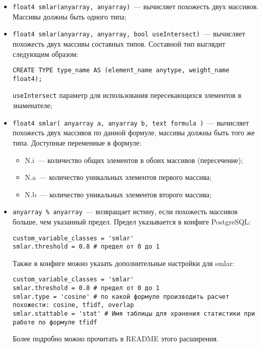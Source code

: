 \begin{itemize}
  \item \lstinline!float4 smlar(anyarray, anyarray)!~--- вычисляет похожесть двух массивов. Массивы должны быть одного типа;
  \item \lstinline!float4 smlar(anyarray, anyarray, bool useIntersect)!~--- вычисляет похожесть двух массивы составных типов. Составной тип выглядит следующим образом:

\begin{lstlisting}[label=lst:smlar5,caption=Составной тип]
CREATE TYPE type_name AS (element_name anytype, weight_name float4);
\end{lstlisting}

  \lstinline!useIntersect! параметр для использования пересекающихся элементов в знаменателе;
  \item \lstinline!float4 smlar( anyarray a, anyarray b, text formula )!~--- вычисляет похожесть двух массивов по данной формуле, массивы должны быть того же типа. Доступные переменные в формуле:

    \begin{itemize}
      \item N.i~--- количество общих элементов в обоих массивов (пересечение);
      \item N.a~--- количество уникальных элементов первого массива;
      \item N.b~--- количество уникальных элементов второго массива;
    \end{itemize}

  \item \lstinline!anyarray % anyarray!~--- возвращает истину, если похожесть массивов больше, чем указанный предел. Предел указывается в конфиге PostgreSQL:

\begin{lstlisting}[label=lst:smlar6,caption=Smlar предел]
custom_variable_classes = 'smlar'
smlar.threshold = 0.8 # предел от 0 до 1
\end{lstlisting}

Также в конфиге можно указать дополнительные настройки для smlar:

\begin{lstlisting}[label=lst:smlar7,caption=Smlar настройки]
custom_variable_classes = 'smlar'
smlar.threshold = 0.8 # предел от 0 до 1
smlar.type = 'cosine' # по какой формуле производить расчет похожести: cosine, tfidf, overlap
smlar.stattable = 'stat' # Имя таблицы для хранения статистики при работе по формуле tfidf
\end{lstlisting}

Более подробно можно прочитать в README этого расширения.
\end{itemize}


